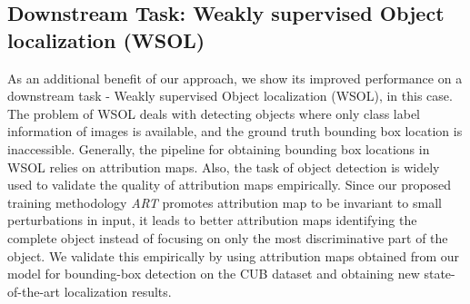 \documentclass[runningheads]{llncs}
\begin{document}
\subsection{Downstream Task: Weakly supervised Object localization (WSOL)}
As an additional benefit of our approach, we show its improved performance on a downstream task - Weakly supervised Object localization (WSOL), in this case. The problem of WSOL deals with detecting objects where only class label information of images is available, and the ground truth bounding box location is inaccessible. Generally, the pipeline for obtaining bounding box locations in WSOL relies on attribution maps. Also, the task of object detection is widely used to validate the quality of attribution maps empirically. Since our proposed training methodology \textit{ART} promotes attribution map to be invariant to small perturbations in input, it leads to better attribution maps identifying the complete object instead of focusing on only the most discriminative part of the object. We validate this empirically by using attribution maps obtained from our model for bounding-box detection on the CUB dataset and obtaining new state-of-the-art localization results. 
\end{document}
